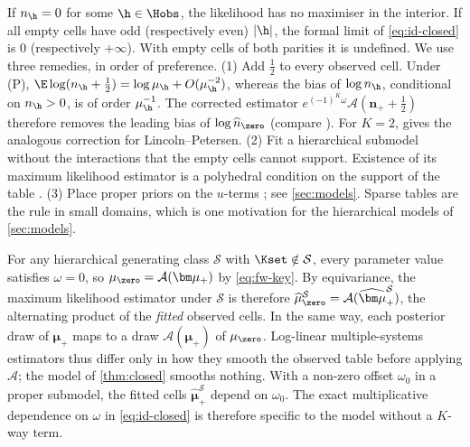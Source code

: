 \begin{remark}\label{rem:id-zeros}
If $n_{\h}=0$ for some $\h\in\Hobs$, the likelihood has no maximiser in the interior. If all empty cells have odd (respectively even) $|\h|$, the formal limit of \eqref{eq:id-closed} is $0$ (respectively $+\infty$). With empty cells of both parities it is undefined. We use three remedies, in order of preference. (1) Add $\tfrac12$ to every observed cell. Under (P), $\E\log(n_{\h}+\tfrac12)=\log\mu_{\h}+O(\mu_{\h}^{-2})$, whereas the bias of $\log n_{\h}$, conditional on $n_{\h}>0$, is of order $\mu_{\h}^{-1}$. The corrected estimator $e^{(-1)^K\omega}\mathcal A(\bm n_++\tfrac12)$ therefore removes the leading bias of $\log\widehat n_{\zero}$ (compare \citealp{gart1967}). For $K=2$, \citet{chapman1951} gives the analogous correction for Lincoln--Petersen. (2) Fit a hierarchical submodel without the interactions that the empty cells cannot support. Existence of its maximum likelihood estimator is a polyhedral condition on the support of the table \citep{fienberg2012}. (3) Place proper priors on the $u$-terms \citep{madigan1997}; see \cref{sec:models}. Sparse tables are the rule in small domains, which is one motivation for the hierarchical models of \cref{sec:models}.
\end{remark}

\begin{remark}\label{rem:id-unify}
For any hierarchical generating class $\mathcal S$ with $\Kset\notin\mathcal S$, every parameter value satisfies $\omega=0$, so $\mu_{\zero}=\mathcal A(\bm\mu_+)$ by \eqref{eq:fw-key}. By equivariance, the maximum likelihood estimator under $\mathcal S$ is therefore $\widehat\mu_{\zero}^{\mathcal S}=\mathcal A(\widehat{\bm\mu}_+^{\mathcal S})$, the alternating product of the \emph{fitted} observed cells. In the same way, each posterior draw of $\bm\mu_+$ maps to a draw $\mathcal A(\bm\mu_+)$ of $\mu_{\zero}$. Log-linear multiple-systems estimators thus differ only in how they smooth the observed table before applying $\mathcal A$; the model of \cref{thm:closed} smooths nothing. With a non-zero offset $\omega_0$ in a proper submodel, the fitted cells $\widehat{\bm\mu}^{\mathcal S}_+$ depend on $\omega_0$. The exact multiplicative dependence on $\omega$ in \eqref{eq:id-closed} is therefore specific to the model without a $K$-way term.
\end{remark}

